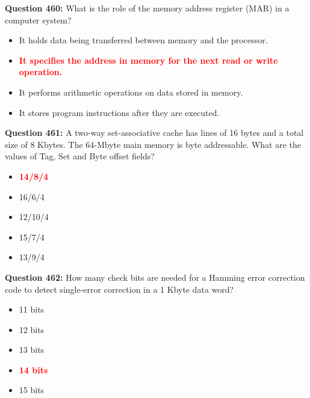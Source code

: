 \documentclass[12pt,a4paper]{article}
\begin{document}
\textbf{Question 460:} What is the role of the memory address register (MAR) in a computer system?

\begin{itemize}
    \item[\textbf{A.}] It holds data being transferred between memory and the processor.
    \item[\textbf{B.}] \textcolor{red}{\textbf{It specifies the address in memory for the next read or write operation.}}
    \item[\textbf{C.}] It performs arithmetic operations on data stored in memory.
    \item[\textbf{D.}] It stores program instructions after they are executed.
\end{itemize}

\vspace{0.5cm}

\textbf{Question 461:} A two-way set-associative cache has lines of 16 bytes and a total size of 8 Kbytes. The 64-Mbyte main memory is byte addressable. What are the values of Tag, Set and Byte offset fields?

\begin{itemize}
    \item[\textbf{A.}] \textcolor{red}{\textbf{14/8/4}}
    \item[\textbf{B.}] 16/6/4
    \item[\textbf{C.}] 12/10/4
    \item[\textbf{D.}] 15/7/4
    \item[\textbf{E.}] 13/9/4
\end{itemize}

\vspace{0.5cm}

\textbf{Question 462:} How many check bits are needed for a Hamming error correction code to detect single-error correction in a 1 Kbyte data word?

\begin{itemize}
    \item[\textbf{A.}] 11 bits
    \item[\textbf{B.}] 12 bits
    \item[\textbf{C.}] 13 bits
    \item[\textbf{D.}] \textcolor{red}{\textbf{14 bits}}
    \item[\textbf{E.}] 15 bits
\end{itemize}

\vspace{0.5cm}
\end{document}
